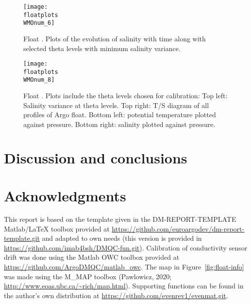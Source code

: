 \documentclass{article}
\begin{document}
\begin{figure}[p]
    \centering    
    \texttt{[image: \\floatplots\\WMOnum\_6]}
    \caption{Float \WMOnum. Plots of the evolution of salinity with time
    along with selected theta levels with minimum salinity variance.} 
    \label{SalErrOnTheta}
\end{figure}
\begin{figure}[p]
  \centerline{\texttt{[image: \\floatplots\\WMOnum\_8]}}
  \caption{Float \WMOnum. Plots include the theta levels chosen for
    calibration: Top left: Salinity variance at theta levels. Top right:
    T/S diagram of all profiles of Argo float. Bottom left: potential
    temperature plotted against pressure. Bottom right: salinity plotted
    against pressure.} 
  \label{Salinity_OWlevels}
\end{figure}

\FloatBarrier
\newpage
\section{Discussion and conclusions}  






\section*{Acknowledgments}
This report is based on the template given in the DM-REPORT-TEMPLATE
Matlab/LaTeX toolbox provided at
\href{url}{https://github.com/euroargodev/dm-report-template.git} and
adapted to own needs (this version is provided in
\href{url}{https://github.com/imab4bsh/DMQC-fun.git}).  
%
Calibration of conductivity sensor drift was done using the Matlab OWC
toolbox provided at \href{url}{https://github.com/ArgoDMQC/matlab\_owc}.
%
The map in Figure~\ref{fig:float-info} was made using the M\_MAP toolbox
(Pawlowicz, 2020; \url{http://www.eoas.ubc.ca/~rich/map.html}).
%
Supporting functions can be found in the author's own distribution at
\href{url}{https://github.com/evenrev1/evenmat.git}.
\end{document}
